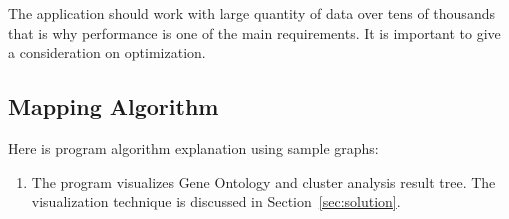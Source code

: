 The application should work with large quantity of data over tens of thousands that is why performance is one of the main requirements. It is important to give a consideration on optimization.


\subsection{Mapping Algorithm}
\label{sec:mapping_algorithm}
Here is program algorithm explanation using sample graphs:
\begin{enumerate}

\item The program visualizes Gene Ontology and cluster analysis result tree. The visualization technique is discussed in Section~\ref{sec:solution}.

\begin{figure}[h!]
\centering
{}
\end{figure}
\end{enumerate}
